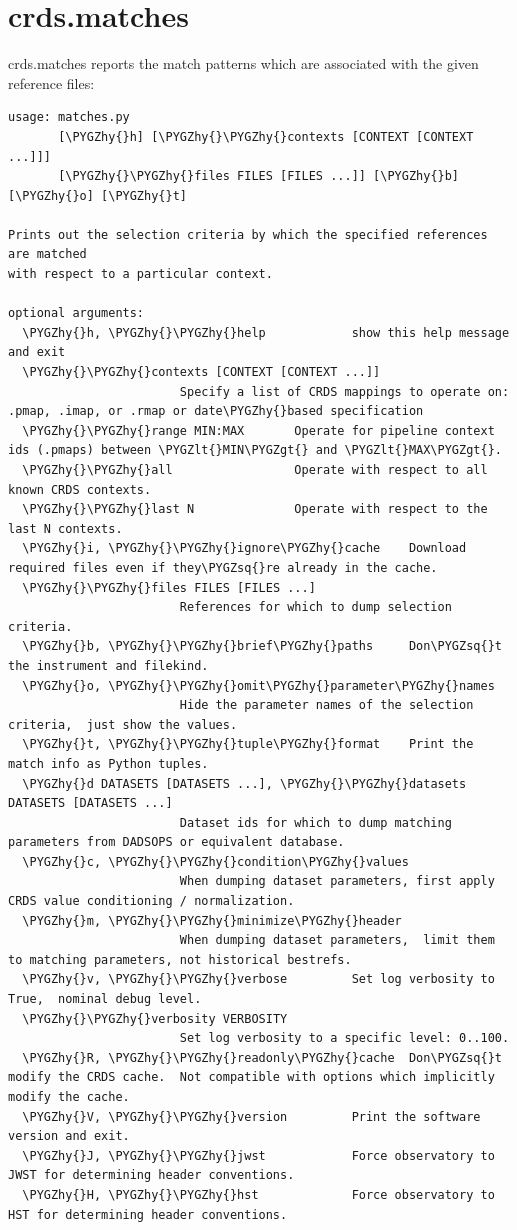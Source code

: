 \documentclass[letterpaper,10pt,english]{sphinxmanual}
\def\PYGZlt{\char`\<}
\def\PYGZgt{\char`\>}
\def\PYGZhy{\char`\-}
\def\PYGZsq{\char`\'}
\begin{document}
\section{crds.matches}
\label{command_line_tools:crds-matches}
crds.matches reports the match patterns which are associated with the given
reference files:

\begin{Verbatim}[commandchars=\\\{\}]
usage: matches.py
       [\PYGZhy{}h] [\PYGZhy{}\PYGZhy{}contexts [CONTEXT [CONTEXT ...]]]
       [\PYGZhy{}\PYGZhy{}files FILES [FILES ...]] [\PYGZhy{}b] [\PYGZhy{}o] [\PYGZhy{}t]

Prints out the selection criteria by which the specified references are matched
with respect to a particular context.

optional arguments:
  \PYGZhy{}h, \PYGZhy{}\PYGZhy{}help            show this help message and exit
  \PYGZhy{}\PYGZhy{}contexts [CONTEXT [CONTEXT ...]]
                        Specify a list of CRDS mappings to operate on: .pmap, .imap, or .rmap or date\PYGZhy{}based specification
  \PYGZhy{}\PYGZhy{}range MIN:MAX       Operate for pipeline context ids (.pmaps) between \PYGZlt{}MIN\PYGZgt{} and \PYGZlt{}MAX\PYGZgt{}.
  \PYGZhy{}\PYGZhy{}all                 Operate with respect to all known CRDS contexts.
  \PYGZhy{}\PYGZhy{}last N              Operate with respect to the last N contexts.
  \PYGZhy{}i, \PYGZhy{}\PYGZhy{}ignore\PYGZhy{}cache    Download required files even if they\PYGZsq{}re already in the cache.
  \PYGZhy{}\PYGZhy{}files FILES [FILES ...]
                        References for which to dump selection criteria.
  \PYGZhy{}b, \PYGZhy{}\PYGZhy{}brief\PYGZhy{}paths     Don\PYGZsq{}t the instrument and filekind.
  \PYGZhy{}o, \PYGZhy{}\PYGZhy{}omit\PYGZhy{}parameter\PYGZhy{}names
                        Hide the parameter names of the selection criteria,  just show the values.
  \PYGZhy{}t, \PYGZhy{}\PYGZhy{}tuple\PYGZhy{}format    Print the match info as Python tuples.
  \PYGZhy{}d DATASETS [DATASETS ...], \PYGZhy{}\PYGZhy{}datasets DATASETS [DATASETS ...]
                        Dataset ids for which to dump matching parameters from DADSOPS or equivalent database.
  \PYGZhy{}c, \PYGZhy{}\PYGZhy{}condition\PYGZhy{}values
                        When dumping dataset parameters, first apply CRDS value conditioning / normalization.
  \PYGZhy{}m, \PYGZhy{}\PYGZhy{}minimize\PYGZhy{}header
                        When dumping dataset parameters,  limit them to matching parameters, not historical bestrefs.
  \PYGZhy{}v, \PYGZhy{}\PYGZhy{}verbose         Set log verbosity to True,  nominal debug level.
  \PYGZhy{}\PYGZhy{}verbosity VERBOSITY
                        Set log verbosity to a specific level: 0..100.
  \PYGZhy{}R, \PYGZhy{}\PYGZhy{}readonly\PYGZhy{}cache  Don\PYGZsq{}t modify the CRDS cache.  Not compatible with options which implicitly modify the cache.
  \PYGZhy{}V, \PYGZhy{}\PYGZhy{}version         Print the software version and exit.
  \PYGZhy{}J, \PYGZhy{}\PYGZhy{}jwst            Force observatory to JWST for determining header conventions.
  \PYGZhy{}H, \PYGZhy{}\PYGZhy{}hst             Force observatory to HST for determining header conventions.
\end{Verbatim}
\end{document}
